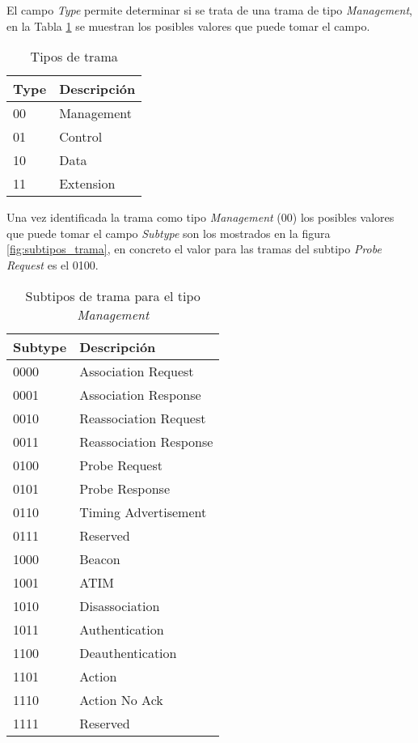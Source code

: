 \documentclass[../proyecto.tex]{subfiles}
\begin{document}
El campo \textit{Type} permite determinar si se trata de una trama de tipo \textit{Management}, en la Tabla \ref{table:tipos_trama} se muestran los posibles valores que puede tomar el campo.\\

\begin{table}[h!]
\centering
\begin{tabular}{ |l|m{20em}| }
\hline
\textbf{Type} & \textbf{Descripción} \\
\hline\hline
00  & Management          \\ \hline
01  & Control  \\ \hline
10  & Data \\ \hline
11 & Extension \\ \hline
\end{tabular}
\caption{Tipos de trama}
\label{table:tipos_trama}
\end{table}

Una vez identificada la trama como tipo \textit{Management} (00) los posibles valores que puede tomar el campo \textit{Subtype} son los mostrados en la figura \ref{fig:subtipos_trama}, en concreto el valor para las tramas del subtipo \textit{Probe Request} es el 0100.

\begin{table}[h!]
\centering
\begin{tabular}{ |l|m{20em}| }
\hline
\textbf{Subtype} & \textbf{Descripción} \\
\hline\hline
0000  & Association Request  \\ \hline
0001  & Association Response \\ \hline
0010  & Reassociation Request \\ \hline
0011  & Reassociation Response \\ \hline
0100  & Probe Request \\ \hline
0101  & Probe Response \\ \hline
0110  & Timing Advertisement \\ \hline
0111  & Reserved \\ \hline
1000  & Beacon \\ \hline
1001  & ATIM \\ \hline
1010  & Disassociation \\ \hline
1011  & Authentication \\ \hline
1100  & Deauthentication \\ \hline
1101  & Action \\ \hline
1110  & Action No Ack \\ \hline
1111  & Reserved \\ \hline
\end{tabular}
\caption{Subtipos de trama para el tipo \textit{Management}}
\label{table:subtipos_trama}
\end{table}
\end{document}
